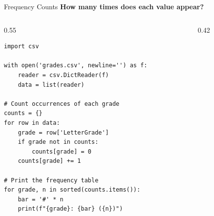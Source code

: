 \documentclass{csbeamer}
\begin{document}
\begin{frame}[fragile]{Frequency Counts}
    \textbf{How many times does each value appear?}

    \vspace{0.5em}

    \begin{columns}
        \begin{column}{0.55\textwidth}
    \begin{lstlisting}
import csv

with open('grades.csv', newline='') as f:
    reader = csv.DictReader(f)
    data = list(reader)

# Count occurrences of each grade
counts = {}
for row in data:
    grade = row['LetterGrade']
    if grade not in counts:
        counts[grade] = 0
    counts[grade] += 1

# Print the frequency table
for grade, n in sorted(counts.items()):
    bar = '#' * n
    print(f"{grade}: {bar} ({n})")
    \end{lstlisting}
        \end{column}
        \begin{column}{0.42\textwidth}
        \end{column}
    \end{columns}
\end{frame}
\end{document}
